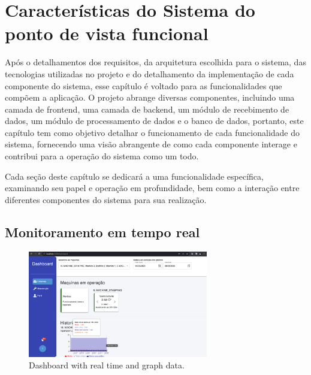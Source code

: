 

\chapter{Características do Sistema do ponto de vista funcional}\label{cap:functions}

Após o detalhamentos dos requisitos, da arquitetura escolhida para o sistema, das tecnologias utilizadas no projeto e do detalhamento da implementação de cada componente do sistema, esse capítulo é voltado para as funcionalidades que compõem a aplicação. O projeto abrange diversas componentes, incluindo uma camada de frontend, uma camada de backend, um módulo de recebimento de dados, um módulo de processamento de dados e o banco de dados, portanto, este capítulo tem como objetivo detalhar o funcionamento de cada funcionalidade do sistema, fornecendo uma visão abrangente de como cada componente interage e contribui para a operação do sistema como um todo.

Cada seção deste capítulo se dedicará a uma funcionalidade específica, examinando seu papel e operação em profundidade, bem como a interação entre diferentes componentes do sistema para sua realização. 


\section[Monitoramento em tempo real]{Monitoramento em tempo real}\label{sec:realtimeMonitoring}

\begin{figure}[htbp]
	\centering
	\includegraphics[width=0.7\textwidth]{images/dashboard.png}
	\caption{Dashboard with real time and graph data.}
	\label{fig:dashboradPage}
\end{figure}

